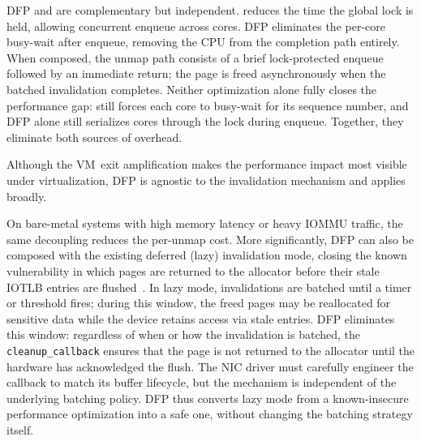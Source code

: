 
DFP and \optOneHeading are complementary but independent. \optOneHeading reduces the time the global lock is held, allowing concurrent enqueue across cores. DFP eliminates the per-core busy-wait after enqueue, removing the CPU from the completion path entirely. When composed, the unmap path consists of a brief lock-protected enqueue followed by an immediate return; the page is freed asynchronously when the batched invalidation completes. Neither optimization alone fully closes the performance gap: \optOne still forces each core to busy-wait for its sequence number, and DFP alone still serializes cores through the lock during enqueue. Together, they eliminate both sources of overhead.



Although the VM~exit amplification makes the performance impact most visible under virtualization, DFP is agnostic to the invalidation mechanism and applies broadly.

On bare-metal systems with high memory latency or heavy IOMMU traffic, the same decoupling reduces the per-unmap cost. More significantly, DFP can also be composed with the existing deferred (lazy) invalidation mode, closing the known vulnerability in which pages are returned to the allocator before their stale IOTLB entries are flushed~. In lazy mode, invalidations are batched until a timer or threshold fires; during this window, the freed pages may be reallocated for sensitive data while the device retains access via stale entries. DFP eliminates this window: regardless of when or how the invalidation is batched, the \texttt{cleanup\_callback} ensures that the page is not returned to the allocator until the hardware has acknowledged the flush. The NIC driver must carefully engineer the callback to match its buffer lifecycle, but the mechanism is independent of the underlying batching policy. DFP thus converts lazy mode from a known-insecure performance optimization into a safe one, without changing the batching strategy itself.

